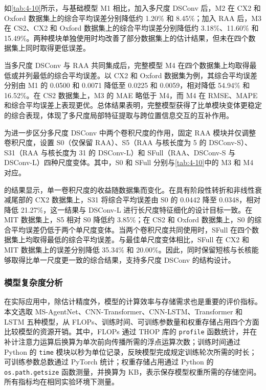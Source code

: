 如\cref{tab:4-10}所示，与基础模型 M1 相比，加入多尺度 DSConv 后，M2 在 CX2 和 Oxford 数据集上的综合平均误差分别降低约 1.20\% 和 8.45\%；加入 RAA 后，M3 在 CS2、CX2 和 Oxford 数据集上的综合平均误差分别降低约 3.18\%、11.60\% 和 15.49\%。两种模块单独使用时均改善了部分数据集上的估计结果，但未在四个数据集上同时取得更低误差。

当多尺度 DSConv 与 RAA 共同集成后，完整模型 M4 在四个数据集上均取得最低或并列最低的综合平均误差。以 CX2 和 Oxford 数据集为例，其综合平均误差分别由 M1 的 0.0500 和 0.0071 降低至 0.0225 和 0.0059，相对降低 54.94\% 和 16.52\%。在 CS2 数据集上，M3 的 MAE 略低于 M4，而 M4 在 RMSE、MAPE 和综合平均误差上表现更优。总体结果表明，完整模型获得了比单模块变体更稳定的综合表现，体现了多尺度局部特征提取与跨位置信息交互的互补作用。

为进一步区分多尺度 DSConv 中两个卷积尺度的作用，固定 RAA 模块并仅调整卷积尺度，设置 S0（仅保留 RAA）、S5（RAA 与核长度为 5 的 DSConv-S）、S31（RAA 与核长度为 31 的 DSConv-L）和 SFull（RAA、DSConv-S 与 DSConv-L）四种尺度变体。其中，S0 和 SFull 分别与\cref{tab:4-10}中的 M3 和 M4 对应。

的结果显示，单一卷积尺度的收益随数据集而变化。在具有阶段性转折和非线性衰减尾部的 CX2 数据集上，S31 将综合平均误差由 S0 的 0.0442 降至 0.0348，相对降低 21.27\%，这一结果与 DSConv-L 进行长尺度特征细化的设计目标一致。在 MIT 数据集上，S5 相对 S0 降低约 3.85\%；在 CS2 和 Oxford 数据集上，S0 的综合平均误差仍低于两个单尺度变体。当两个卷积尺度共同使用时，SFull 在四个数据集上均取得最低的综合平均误差。与最佳单尺度变体相比，SFull 在 CX2 和 MIT 数据集上的误差分别降低 35.34\% 和 20.00\%。因此，同时保留短核与长核能够取得比单一尺度更一致的综合结果，支持多尺度 DSConv 的结构设计。



\FloatBarrier

\subsubsection{模型复杂度分析}

在实际应用中，除估计精度外，模型的计算效率与存储需求也是重要的评价指标\cite{ref77}。本文选取 MS-AgentNet、CNN-Transformer、CNN-LSTM、Transformer 和 LSTM 五种模型，从 FLOPs、训练时间、可训练参数量和权重存储占用四个方面比较模型的资源开销。其中，FLOPs 通过 THOP 库的 \texttt{profile} 函数统计，并在补计注意力运算后换算为单次前向传播所需的浮点运算次数；训练时间通过 Python 的 \texttt{time} 模块以秒为单位记录，反映模型完成规定训练轮次所需的时长；可训练参数总数通过 PyTorch 统计；权重存储占用通过 Python 的 \texttt{os.path.getsize} 函数测量，并换算为 KB，表示保存模型权重所需的存储空间。所有指标均在相同实验环境下测量。

